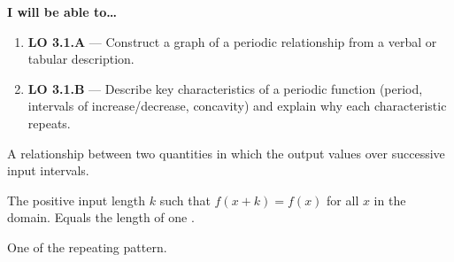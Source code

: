 \documentclass[10pt]{article}
\begin{document}
\namedateperiod

\vspace{0.10in}

\begin{objectivebox}
\textbf{I will be able to\ldots}
\begin{enumerate}[leftmargin=1.5em, itemsep=4pt]
  \item \textbf{LO 3.1.A} --- Construct a graph of a periodic relationship
    from a verbal or tabular description. \writeline
  \item \textbf{LO 3.1.B} --- Describe key characteristics of a periodic
    function (period, intervals of increase/decrease, concavity) and explain
    why each characteristic repeats. \writeline
\end{enumerate}
\end{objectivebox}

\vspace{0.08in}

\begin{vocabbox}
\begin{description}[leftmargin=0pt, itemsep=6pt]
  \item[\termblanklong{periodic relationship}]
    A relationship between two quantities in which the output values
    \underline{\hspace{3.5cm}} over
    successive \underline{\hspace{3.5cm}} input intervals.

  \item[\termblanklong{period}]
    The \underline{\hspace{2.5cm}} positive input length $k$ such that
    $f(x + k) = f(x)$ for all $x$ in the domain. Equals the length of
    one \underline{\hspace{2cm}}.

  \item[\termblanklong{cycle}]
    One \underline{\hspace{3cm}} of the repeating pattern.
\end{description}
\end{vocabbox}

\vspace{0.08in}
\end{document}
